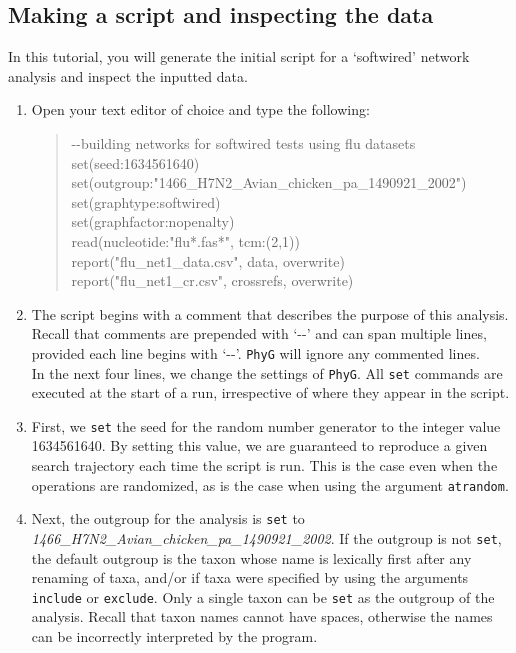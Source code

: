 \documentclass[11pt]{article}
\newcommand{\phyg}{\texttt{PhyG} }
\begin{document}
\subsection{Making a script and inspecting the data}
\label{subsec:networkscript}

In this tutorial, you will generate the initial script for a `softwired' network analysis 
and inspect the inputted data.

\begin{enumerate}

\item Open your text editor of choice and type the following:

	\begin{quote}	
	-\/-building networks for softwired tests using flu datasets\\
	set(seed:1634561640)\\
	set(outgroup:"1466\_H7N2\_Avian\_chicken\_pa\_1490921\_2002")\\
	set(graphtype:softwired)\\
	set(graphfactor:nopenalty)\\ 
	read(nucleotide:"flu*.fas*", tcm:(2,1))\\
	report("flu\_net1\_data.csv", data, overwrite)\\
	report("flu\_net1\_cr.csv", crossrefs, overwrite)
	\end{quote}

\item The script begins with a comment that describes the purpose of this analysis. 
Recall that comments are prepended with `-{}-' and can span multiple lines, provided 
each line begins with `-{}-'. \phyg will ignore any commented lines.\\

In the next four lines, we change the settings of \texttt{PhyG}. All \texttt{set}
commands are executed at the start of a run, irrespective of where they appear 
in the script. 

\item First, we \texttt{set} the seed for the random number generator to the 
integer value 1634561640. By setting this value, we are guaranteed to reproduce 
a given search trajectory each time the script is run. This is the case even when the
operations are randomized, as is the case when using the argument \texttt{atrandom}.

\item Next, the outgroup for the analysis is \texttt{set} to 
\emph{1466\_H7N2\_Avian\_chicken\_pa\_1490921\_2002}. If the outgroup is not 
\texttt{set}, the default outgroup is the taxon whose name is lexically first after any 
renaming of taxa, and/or if taxa were specified by using the arguments \texttt{include}
or \texttt{exclude}. Only a single taxon can be  \texttt{set} as the outgroup of the analysis. 
Recall that taxon names cannot have spaces, otherwise the names can be incorrectly 
interpreted by the program.


\end{enumerate}
\end{document}
